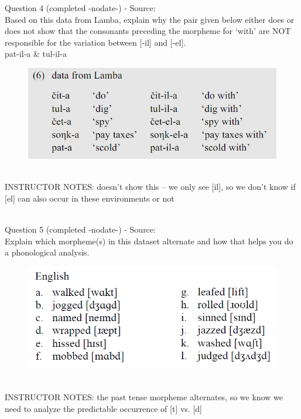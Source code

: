 \documentclass[12pt]{article}
\begin{document}
{\large Question 4} (completed -nodate-) - Source: \\

Based on this data from Lamba, explain why the pair given below either does or does not show that the consonants preceding the morpheme for `with' are NOT responsible for the variation between [-il] and [-el].\\

pat-il-a \& tul-il-a

\begin{figure}[H]
\includegraphics{../images/peng119_lamba.png}
\end{figure}

~\\
INSTRUCTOR NOTES: doesn't show this -- we only see [il], so we don't know if [el] can also occur in these environments or not


~\\

{\large Question 5} (completed -nodate-) - Source: \\

Explain which morpheme(s) in this dataset alternate and how that helps you do a phonological analysis.\\

\begin{figure}[H]
\includegraphics{../images/english_past.png}
\end{figure}

~\\
INSTRUCTOR NOTES: the past tense morpheme alternates, so we know we need to analyze the predictable occurrence of [t] vs. [d]
\end{document}
